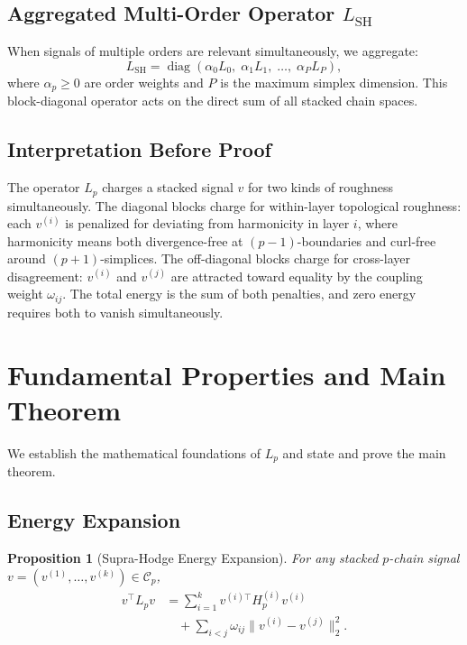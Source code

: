 \documentclass[11pt]{article}
\newtheorem{proposition}[theorem]{Proposition}
\theoremstyle{definition}
\theoremstyle{remark}
\newcommand{\LSH}{L_{\mathrm{SH}}}
\newcommand{\calC}{\mathcal{C}}
\DeclareMathOperator{\diag}{diag}
\begin{document}
\subsection{\texorpdfstring{Aggregated Multi-Order Operator $L_{\mathrm{SH}}$}{Aggregated Multi-Order Operator L\_SH}}

When signals of multiple orders are relevant simultaneously, we aggregate:
\[
  \LSH = \diag(\alpha_0 L_0,\; \alpha_1 L_1,\; \dots,\; \alpha_P L_P),
\]
where $\alpha_p\geq 0$ are order weights and $P$ is the maximum simplex
dimension. This block-diagonal operator acts on the direct sum of all
stacked chain spaces.

\subsection{Interpretation Before Proof}

The operator $L_p$ charges a stacked signal $v$ for two kinds of roughness
simultaneously. The diagonal blocks charge for within-layer topological
roughness: each $v^{(i)}$ is penalized for deviating from harmonicity in layer
$i$, where harmonicity means both divergence-free at $(p-1)$-boundaries and
curl-free around $(p+1)$-simplices. The off-diagonal blocks charge for
cross-layer disagreement: $v^{(i)}$ and $v^{(j)}$ are attracted toward
equality by the coupling weight $\omega_{ij}$. The total energy is the sum of
both penalties, and zero energy requires both to vanish simultaneously.


\section{Fundamental Properties and Main Theorem}
\label{sec:properties}

We establish the mathematical foundations of $L_p$ and state and prove the
main theorem.

\subsection{Energy Expansion}

\begin{proposition}[Supra-Hodge Energy Expansion]
\label{prop:sh_energy}
For any stacked $p$-chain signal $v=(v^{(1)},\allowbreak \dots,\allowbreak v^{(k)})\in\calC_p$,
\begingroup
\small
\[
  \begin{aligned}
    v^\top L_p v
    &= \sum_{i=1}^k v^{(i)\top}H_p^{(i)}v^{(i)} \\
    &\quad + \sum_{i<j}\omega_{ij}\|v^{(i)}-v^{(j)}\|_2^2.
  \end{aligned}
\]
\endgroup
\end{proposition}
\end{document}
